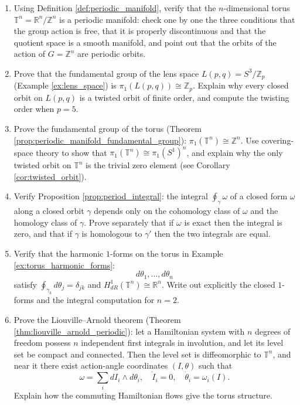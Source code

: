 \begin{enumerate}[leftmargin=3em, label=\textbf{Exercise \arabic*}]
    \item Using Definition \ref{def:periodic_manifold}, verify that the $n$-dimensional torus
    $\mathbb{T}^n=\mathbb{R}^n/\mathbb{Z}^n$ is a periodic manifold:
    check one by one the three conditions that the group action is free, that it is properly
    discontinuous and that the quotient space is a smooth manifold,
    and point out that the orbits of the action of $G=\mathbb{Z}^n$ are periodic orbits.

    \item Prove that the fundamental group of the lens space $L(p,q)=S^3/\mathbb{Z}_p$
    (Example \ref{ex:lens_space}) is $\pi_1(L(p,q))\cong\mathbb{Z}_p$.
    Explain why every closed orbit on $L(p,q)$ is a twisted orbit of finite order,
    and compute the twisting order when $p=5$.

    \item Prove the fundamental group of the torus (Theorem \ref{prop:periodic_manifold_fundamental_group}):
    $\pi_1(\mathbb{T}^n)\cong\mathbb{Z}^n$.
    Use covering-space theory to show that $\pi_1(\mathbb{T}^n)\cong\pi_1(S^1)^n$,
    and explain why the only twisted orbit on $\mathbb{T}^n$ is the trivial zero element
    (see Corollary \ref{cor:twisted_orbit}).

    \item Verify Proposition \ref{prop:period_integral}:
    the integral $\oint_\gamma\omega$ of a closed form $\omega$ along a closed orbit $\gamma$
    depends only on the cohomology class of $\omega$ and the homology class of $\gamma$.
    Prove separately that if $\omega$ is exact then the integral is zero,
    and that if $\gamma$ is homologous to $\gamma'$ then the two integrals are equal.

    \item Verify that the harmonic $1$-forms on the torus in Example \ref{ex:torus_harmonic_forms}:
    \[
    d\theta_1,\dots,d\theta_n
    \]
    satisfy $\oint_{\gamma_k}d\theta_j=\delta_{jk}$
    and $H^1_{dR}(\mathbb{T}^n)\cong\mathbb{R}^n$.
    Write out explicitly the closed $1$-forms and the integral computation for $n=2$.

    \item Prove the Liouville--Arnold theorem (Theorem \ref{thm:liouville_arnold_periodic}):
    let a Hamiltonian system with $n$ degrees of freedom possess $n$ independent first integrals in involution,
    and let its level set be compact and connected. Then the level set is diffeomorphic to $\mathbb{T}^n$,
    and near it there exist action-angle coordinates $(I,\theta)$ such that
    \[
    \omega=\sum_i dI_i\wedge d\theta_i,\quad
    \dot{I}_i=0,\quad \dot{\theta}_i=\omega_i(I).
    \]
    Explain how the commuting Hamiltonian flows give the torus structure.


\end{enumerate}
